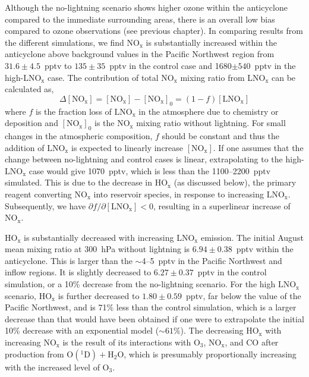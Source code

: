 Although the no-lightning scenario shows higher ozone within the anticyclone compared to the immediate surrounding
areas, there is an overall low bias compared to ozone observations (see previous chapter).
In comparing results from the different simulations, we find
NO$_{\mathrm{x}}$ is substantially increased within the anticyclone above background values in the Pacific Northwest
region from $31.6\pm4.5$~pptv to $135\pm35$~pptv in the control case
and 1680$\pm540$~pptv in the high-$\mathrm{LNO_x}$ case.
The contribution of total NO$_{\mathrm{x}}$ mixing ratio from LNO$_{\mathrm{x}}$ can be calculated as,
$$
\Delta[\mathrm{NO_x}] = [\mathrm{NO_x}]-[\mathrm{NO_x}]_0 = (1-f)[\mathrm{LNO_x}]
$$
where $f$ is the fraction loss of $\mathrm{LNO_x}$ in the atmosphere due to
chemistry or deposition and $[\mathrm{NO_x}]_0$ is the $\mathrm{NO_x}$
mixing ratio without lightning. For small changes in the atmospheric composition, $f$ should be
constant and thus the addition of $\mathrm{LNO_x}$ is expected to linearly
increase $[\mathrm{NO_x}]$.
If one assumes that the change between no-lightning and control cases is linear, extrapolating
to the high-$\mathrm{LNO_x}$ case would give 1070~pptv, which is less than
the 1100--2200~pptv simulated. This is due to the decrease in $\mathrm{HO_x}$
(as discussed below), the primary reagent converting $\mathrm{NO_x}$ into
reservoir species, in response to increasing $\mathrm{LNO_x}$. Subsequently,
we have $\partial f/\partial[\mathrm{LNO_x}]<0$, resulting in a superlinear increase of $\mathrm{NO_x}$.

HO$_\mathrm{x}$ is substantially decreased with
increasing LNO$_\mathrm{x}$ emission. The initial August mean mixing ratio
at 300~hPa without lightning is $6.94\pm0.38$~pptv within the anticyclone. This
is larger than the $\sim$4--5~pptv in the Pacific Northwest and inflow regions. It
is slightly decreased to $6.27\pm0.37$~pptv in the control simulation, or a
10\% decrease from the no-lightning scenario. For the high $\mathrm{LNO_x}$
scenario, HO$_\mathrm{x}$ is further decreased to $1.80\pm0.59$~pptv, far
below the value of the Pacific Northwest, and is 71\% less than the
control simulation, which is a larger decrease than that would have been
obtained if one were to extrapolate the initial 10\% decrease with an
exponential model ($\sim61\%$). The decreasing  HO$_\mathrm{x}$ with
increasing NO$_\mathrm{x}$ is the result of its interactions with O$_3$,
NO$_\mathrm{x}$, and CO after production from $\mathrm{O(^1D)+H_2O}$,
which is presumably proportionally increasing with the increased level of
O$_3$.


